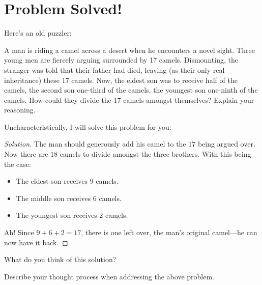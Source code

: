 \newpage
\section{Problem Solved!}\label{A:ProblemSolved}

Here's an old puzzler:


\begin{prob}
A man is riding a camel across a desert when he encounters a novel
sight. Three young men are fiercely arguing surrounded by 17
camels. Dismounting, the stranger was told that their father had died,
leaving (as their only real inheritance) these 17 camels. Now, the
eldest son was to receive half of the camels, the second son one-third
of the camels, the youngest son one-ninth of the camels. How could
they divide the 17 camels amongst themselves?  Explain your
reasoning.
\end{prob}

Uncharacteristically, I will solve this problem for you:

\begin{proof}[Solution] 
The man should generously add his camel to the $17$ being argued
over. Now there are $18$ camels to divide amongst the three
brothers. With this being the case:
\begin{itemize}
\item The eldest son receives $9$ camels.
\item The middle son receives $6$ camels.
\item The youngest son receives $2$ camels.
\end{itemize}
Ah! Since $9+6+2 = 17$, there is one left over, the man's original
camel---he can now have it back.
\end{proof}

\begin{prob}
What do you think of this solution?
\end{prob}

\begin{prob}
Describe your thought process when addressing the above
problem.
\end{prob}

